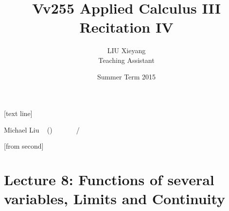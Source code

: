 \documentclass[10pt]{beamer}
\begin{document}



[text line]{%
	\color{blue!40!black}\parbox{\linewidth}{\vspace*{-8pt}Michael Liu ~ (\insertshortinstitute)\hfill\insertshorttitle\hfill\insertshortdate~~~~~~\insertframenumber{}~/~\inserttotalframenumber}}


[from second] 

\newcommand{\tabincell}[2]{\begin{tabular}{@{}#1@{}}#2\end{tabular}}


\title[Vv255 Applied Calculus III]{Vv255 Applied Calculus III\\{\small Recitation IV}}   
\author[Michael Liu]{LIU Xieyang\\{\tiny Teaching Assistant}} 
\date[Summer 2015]{Summer Term 2015} 
\begin{frame}
	\titlepage
\end{frame}






\section{Lecture 8: Functions of several variables, Limits and Continuity} 
\end{document}
